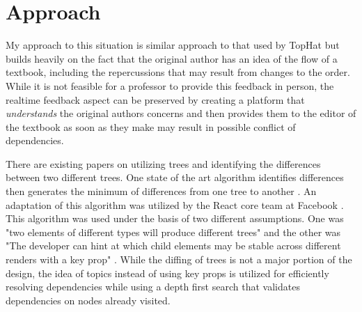 \section{Approach}

My approach to this situation is similar approach to that used by TopHat but builds heavily on the fact that the original author has an idea of the flow of a textbook, including the repercussions that may result from changes to the order. While it is not feasible for a professor to provide this feedback in person, the realtime feedback aspect can be preserved by creating a platform that \textit{understands} the original authors concerns and then provides them to the editor of the textbook as soon as they make may result in possible conflict of dependencies.

There are existing papers on utilizing trees and identifying the differences between two different trees. One state of the art algorithm identifies differences then generates the minimum of differences from one tree to another \cite{bile}\cite{tsur}. An adaptation of this algorithm was utilized by the React core team at Facebook \cite{reactReconcile}. This algorithm was used under the basis of two different assumptions. One was "two elements of different types will produce different trees" and the other was "The developer can hint at which child elements may be stable across different renders with a key prop" \cite{reactReconcile}. While the diffing of trees is not a major portion of the design, the idea of topics instead of using key props is utilized for efficiently resolving dependencies while using a depth first search that validates dependencies on nodes already visited.

